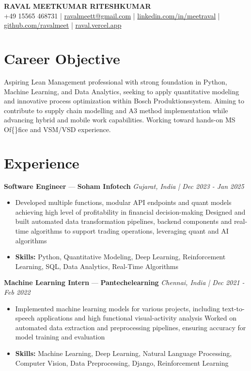 \documentclass[a4paper,10pt]{article}
\begin{document}
\begin{center}
  {\Large\bfseries RAVAL MEETKUMAR RITESHKUMAR}\\[2pt]
  {\small +49 15565 468731 \;|\; \href{mailto:ravalmeett@gmail.com}{ravalmeett@gmail.com} \;|\; \href{https://www.linkedin.com/in/meetraval/}{linkedin.com/in/meetraval} \;|\; \href{https://github.com/ravalmeet}{github.com/ravalmeet} \;|\; \href{https://raval.vercel.app/}{raval.vercel.app}}
\end{center}
\vspace{-3pt}

\section*{Career Objective}
Aspiring Lean Management professional with strong foundation in Python, Machine Learning, and Data Analytics, seeking to apply quantitative modeling and innovative process optimization within Bosch Produktionssystem. Aiming to contribute to supply chain modelling and A3 method implementation while advancing hybrid and mobile work capabilities. Working toward hands-on MS Of\{\}fice and VSM/VSD experience.\par

\section*{Experience}
\textbf{Software Engineer} — \textbf{Soham Infotech} \hfill \textit{Gujarat, India \;|\; Dec 2023 - Jan 2025}\par
\vspace{1pt}
\begin{itemize}
  \item Developed multiple functions, modular API endpoints and quant models achieving high level of profitability in financial decision-making Designed and built automated data transformation pipelines, backend components and real-time algorithms to support trading operations, leveraging quant and AI algorithms
  \item \textbf{Skills:} Python, Quantitative Modeling, Deep Learning, Reinforcement Learning, SQL, Data Analytics, Real-Time Algorithms
\end{itemize}
\vspace{3pt}
\textbf{Machine Learning Intern} — \textbf{Pantechelearning} \hfill \textit{Chennai, India \;|\; Dec 2021 - Feb 2022}\par
\vspace{1pt}
\begin{itemize}
  \item Implemented machine learning models for various projects, including text-to-speech applications and high functional visual-activity analysis Worked on automated data extraction and preprocessing pipelines, ensuring accuracy for model training and evaluation
  \item \textbf{Skills:} Machine Learning, Deep Learning, Natural Language Processing, Computer Vision, Data Preprocessing, Django, Reinforcement Learning
\end{itemize}
\end{document}
